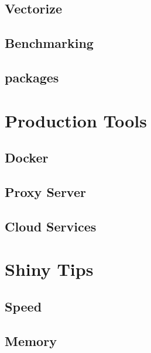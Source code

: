 \documentclass[
]{book}
\begin{document}
\hypertarget{Vectorize}{%
\chapter{Vectorize}\label{Vectorize}}

\hypertarget{bench}{%
\chapter{Benchmarking}\label{bench}}

\hypertarget{packages}{%
\chapter{packages}\label{packages}}

\hypertarget{part-production-tools}{%
\part{Production Tools}\label{part-production-tools}}

\hypertarget{syntax}{%
\chapter{Docker}\label{syntax}}

\hypertarget{proxy}{%
\chapter{Proxy Server}\label{proxy}}

\hypertarget{cloud}{%
\chapter{Cloud Services}\label{cloud}}

\hypertarget{part-shiny-tips}{%
\part{Shiny Tips}\label{part-shiny-tips}}

\hypertarget{shinyspeed}{%
\chapter{Speed}\label{shinyspeed}}

\hypertarget{shinymemory}{%
\chapter{Memory}\label{shinymemory}}

  
\end{document}
